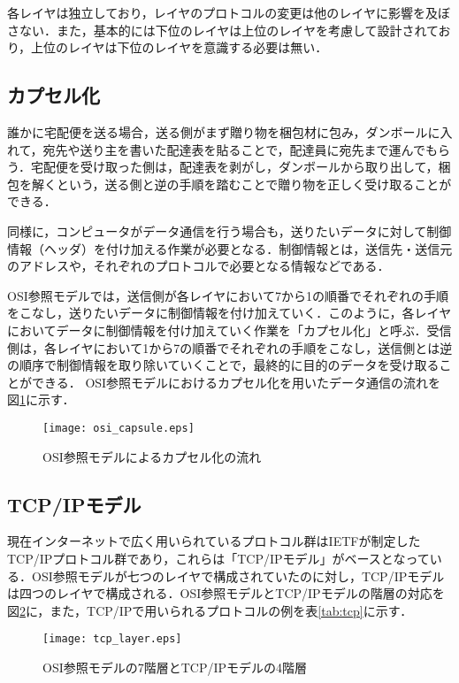 	各レイヤは独立しており，レイヤのプロトコルの変更は他のレイヤに影響を及ぼさない．また，基本的には下位のレイヤは上位のレイヤを考慮して設計されており，上位のレイヤは下位のレイヤを意識する必要は無い．


\subsection{カプセル化}

	誰かに宅配便を送る場合，送る側がまず贈り物を梱包材に包み，ダンボールに入れて，宛先や送り主を書いた配達表を貼ることで，配達員に宛先まで運んでもらう．宅配便を受け取った側は，配達表を剥がし，ダンボールから取り出して，梱包を解くという，送る側と逆の手順を踏むことで贈り物を正しく受け取ることができる．
	
	同様に，コンピュータがデータ通信を行う場合も，送りたいデータに対して制御情報（ヘッダ）を付け加える作業が必要となる．制御情報とは，送信先・送信元のアドレスや，それぞれのプロトコルで必要となる情報などである．
	
	OSI参照モデルでは，送信側が各レイヤにおいて7から1の順番でそれぞれの手順をこなし，送りたいデータに制御情報を付け加えていく．このように，各レイヤにおいてデータに制御情報を付け加えていく作業を「カプセル化」と呼ぶ．受信側は，各レイヤにおいて1から7の順番でそれぞれの手順をこなし，送信側とは逆の順序で制御情報を取り除いていくことで，最終的に目的のデータを受け取ることができる．
	OSI参照モデルにおけるカプセル化を用いたデータ通信の流れを図\ref{fig:capsule}に示す．

	\begin{figure}[htb]
		\begin{center}
			\texttt{[image: osi\_capsule.eps]}
		\end{center}
		\caption{OSI参照モデルによるカプセル化の流れ}
		 \label{fig:capsule}
	\end{figure}


\subsection{TCP/IPモデル}
		
	現在インターネットで広く用いられているプロトコル群はIETFが制定したTCP/IPプロトコル群であり，これらは「TCP/IPモデル」がベースとなっている．OSI参照モデルが七つのレイヤで構成されていたのに対し，TCP/IPモデルは四つのレイヤで構成される．OSI参照モデルとTCP/IPモデルの階層の対応を図\ref{fig:tcp_layer}に，また，TCP/IPで用いられるプロトコルの例を表\ref{tab:tcp}に示す．
	
	\begin{figure}[htb]
		\begin{center}
			\texttt{[image: tcp\_layer.eps]}
		\end{center}
		\caption{OSI参照モデルの7階層とTCP/IPモデルの4階層}
		 \label{fig:tcp_layer}
	\end{figure}

